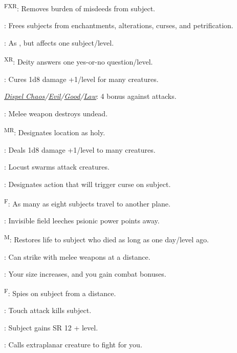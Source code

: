 \textsuperscript{FXR}: Removes burden of misdeeds from subject.

: Frees subjects from enchantments, alterations, curses, and petrification.

: As , but affects one subject/level.

\textsuperscript{XR}: Deity answers one yes-or-no question/level.

: Cures 1d8 damage +1/level for many creatures.

\noindent\textit{\hyperref[spell:Dispel Chaos]{Dispel Chaos}/\hyperref[spell:Dispel Evil]{Evil}/\hyperref[spell:Dispel Good]{Good}/\hyperref[spell:Dispel Law]{Law}}: 4 bonus against attacks.

: Melee weapon destroys undead.


\textsuperscript{MR}: Designates location as holy.

: Deals 1d8 damage +1/level to many creatures.

: Locust swarms attack creatures.

: Designates action that will trigger curse on subject.

\textsuperscript{F}: As many as eight subjects travel to another plane.

: Invisible field leeches psionic power points away.

\textsuperscript{M}: Restores life to subject who died as long as one day/level ago.

: Can strike with melee weapons at a distance. %

: Your size increases, and you gain combat bonuses.

\textsuperscript{F}: Spies on subject from a distance.

: Touch attack kills subject.

: Subject gains SR 12 + level.

\footnotemark[1]: Calls extraplanar creature to fight for you.


